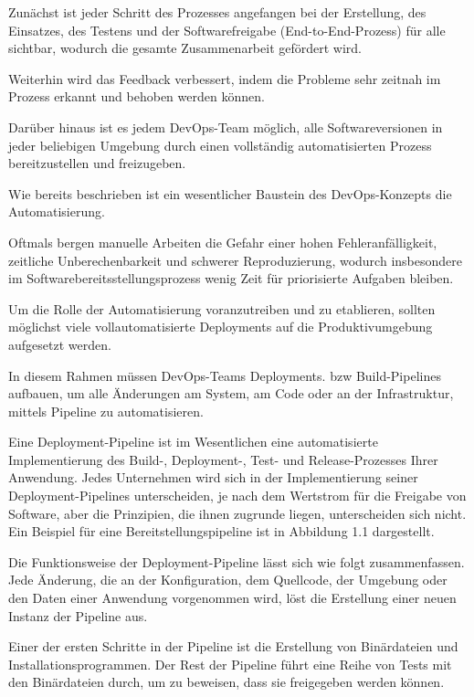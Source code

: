 Zunächst ist jeder Schritt des Prozesses angefangen bei der Erstellung, des Einsatzes, des Testens und der Softwarefreigabe (End-to-End-Prozess) für alle sichtbar, wodurch die gesamte Zusammenarbeit gefördert wird. 

Weiterhin wird das Feedback verbessert, indem die Probleme sehr zeitnah im Prozess erkannt und behoben werden können. 

Darüber hinaus ist es jedem DevOps-Team möglich, alle Softwareversionen in jeder beliebigen Umgebung durch einen vollständig automatisierten Prozess bereitzustellen und freizugeben.






Wie bereits beschrieben ist ein wesentlicher Baustein des DevOps-Konzepts die Automatisierung. 

Oftmals bergen manuelle Arbeiten die Gefahr einer hohen Fehleranfälligkeit, zeitliche Unberechenbarkeit und schwerer Reproduzierung, wodurch insbesondere im Softwarebereitsstellungsprozess wenig Zeit für priorisierte Aufgaben bleiben. 

Um die Rolle der Automatisierung voranzutreiben und zu etablieren, sollten möglichst viele vollautomatisierte Deployments auf die Produktivumgebung aufgesetzt werden.   

In diesem Rahmen müssen DevOps-Teams Deployments. bzw Build-Pipelines aufbauen, um alle Änderungen am System, am Code oder an der Infrastruktur, mittels Pipeline zu automatisieren. 










Eine Deployment-Pipeline ist im Wesentlichen eine automatisierte Implementierung des Build-, Deployment-, Test- und Release-Prozesses Ihrer Anwendung. Jedes Unternehmen wird sich in der Implementierung seiner Deployment-Pipelines unterscheiden, je nach dem Wertstrom für die Freigabe von Software, aber die Prinzipien, die ihnen zugrunde liegen, unterscheiden sich nicht. Ein Beispiel für eine Bereitstellungspipeline ist in Abbildung 1.1 dargestellt.



Die Funktionsweise der Deployment-Pipeline lässt sich wie folgt zusammenfassen. Jede Änderung, die an der Konfiguration, dem Quellcode, der Umgebung oder den Daten einer Anwendung vorgenommen wird, löst die Erstellung einer neuen Instanz der Pipeline aus. 

Einer der ersten Schritte in der Pipeline ist die Erstellung von Binärdateien und Installationsprogrammen. Der Rest der Pipeline führt eine Reihe von Tests mit den Binärdateien durch, um zu beweisen, dass sie freigegeben werden können. 

